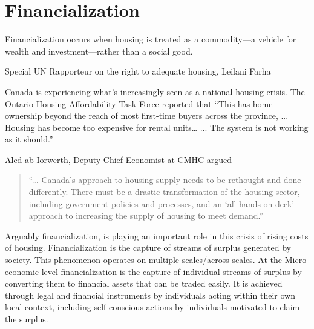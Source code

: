 \chapter{Financialization} \label{chapter-financialization}
\epigraph{Financialization occurs when housing is treated as a commodity—a vehicle for wealth and investment—rather than a social good.}{Special UN Rapporteur on the right to adequate housing, Leilani Farha}


Canada is experiencing what's increasingly seen as a national housing crisis. The Ontario Housing Affordability Task Force reported that ``This has home ownership beyond the reach of most first-time buyers across the province, ... Housing has become too expensive for rental units…  ... %
The system is not working as it should.''

Aled ab Iorwerth, Deputy Chief Economist at CMHC argued
\begin{quotation}
     “… Canada’s approach to housing supply needs to be rethought and done differently. There must be a drastic transformation of the housing sector, including government policies and processes, and an ‘all-hands-on-deck’ approach to increasing the supply of housing to meet demand.”\cite{CanadaHousingSupply2022}
\end{quotation}

Arguably financialization, %
is playing an important role in this crisis of rising costs of housing.
Financialization is the capture of  streams of surplus generated by society. This phenomenon operates on multiple scales/across scales.
At the Micro-economic level financialization is the capture of individual streams of surplus by converting them to financial assets that can be traded easily. It is achieved through legal and financial instruments by individuals acting within their own local context, including self conscious actions by individuals motivated to claim the surplus.




